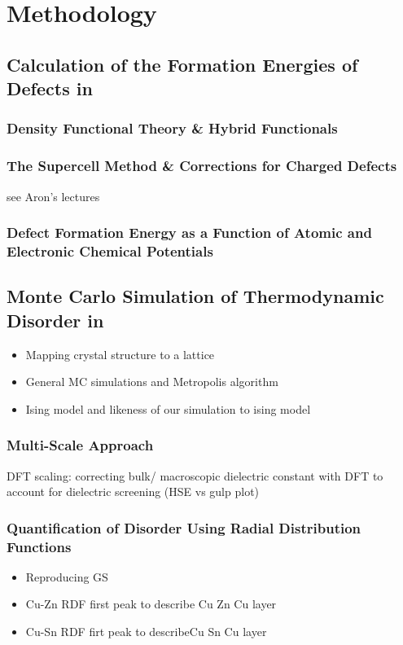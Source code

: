\chapter{Methodology}

\section{Calculation of the Formation Energies of Defects in \CZTS}
\subsection{Density Functional Theory \& Hybrid Functionals}

\subsection{The Supercell Method \& Corrections for Charged Defects}
see Aron's lectures

\subsection{Defect Formation Energy as a Function of Atomic and Electronic Chemical Potentials}


\section{Monte Carlo Simulation of Thermodynamic Disorder  in \CZTS}
\begin{itemize}
\item Mapping crystal structure to a lattice
\item General MC simulations and Metropolis algorithm
\item Ising model and likeness of our simulation to ising model
\end{itemize}

\subsection{Multi-Scale Approach}
DFT scaling: correcting bulk/ macroscopic dielectric constant with DFT to account for dielectric screening (HSE vs gulp plot)

\subsection{Quantification of Disorder Using Radial Distribution Functions}
\begin{itemize}
\item Reproducing GS
\item Cu-Zn RDF first peak to describe Cu Zn Cu layer
\item Cu-Sn RDF firt peak to describeCu Sn Cu layer
\end{itemize}


